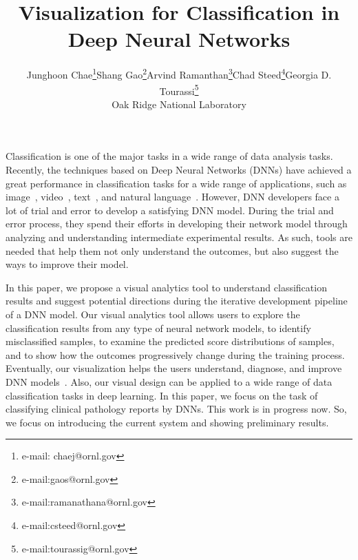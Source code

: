 \documentclass{vgtc}                          %
\title{Visualization for Classification in Deep Neural Networks}
\author{Junghoon Chae\thanks{e-mail: chaej@ornl.gov}\qquad Shang Gao\thanks{e-mail:gaos@ornl.gov}\qquad Arvind Ramanthan\thanks{e-mail:ramanathana@ornl.gov}\qquad Chad Steed\thanks{e-mail:csteed@ornl.gov}\qquad Georgia D. Tourassi\thanks{e-mail:tourassig@ornl.gov} \\ %
        \scriptsize Oak Ridge National Laboratory %
}
\begin{document}

\maketitle
Classification is one of the major tasks in a wide range of data analysis tasks.
Recently, the techniques based on Deep Neural Networks (DNNs) have achieved a great performance in classification tasks for a wide range of applications, such as image~\cite{krizhevsky2012imagenet}, video~\cite{karpathy2014large}, text~\cite{kim2014convolutional}, and natural language~\cite{collobert2011natural}.
However, DNN developers face a lot of trial and error to develop a satisfying DNN model.
During the trial and error process, they spend their efforts in developing their network model through analyzing and understanding intermediate experimental results.
As such, tools are needed that help them not only understand the outcomes, but also suggest the ways to improve their model.

In this paper, we propose a visual analytics tool to understand classification results and suggest potential directions during the iterative development pipeline of a DNN model.
Our visual analytics tool allows users to explore the classification results from any type of neural network models, to identify misclassified samples, to examine the predicted score distributions of samples, and to show how the outcomes progressively change during the training process.
Eventually, our visualization helps the users understand, diagnose, and improve DNN models~\cite{liu2017towards}.
Also, our visual design can be applied to a wide range of data classification tasks in deep learning.
In this paper, we focus on the task of classifying clinical pathology reports by DNNs.
This work is in progress now.
So, we focus on introducing the current system and showing preliminary results.
\end{document}
